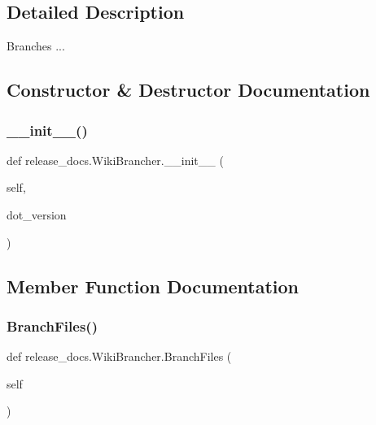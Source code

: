 \subsection{Detailed Description}
\begin{DoxyVerb}Branches ...\end{DoxyVerb}
 

\subsection{Constructor \& Destructor Documentation}
\mbox{\label{classrelease__docs_1_1WikiBrancher_a344b32e2b65f0e8bab9fbf1e670d33fd}} 
\subsubsection{\texorpdfstring{\_\_init\_\_()}{\_\_init\_\_()}}
{\footnotesize\ttfamily def release\+\_\+docs.\+Wiki\+Brancher.\+\_\+\+\_\+init\+\_\+\+\_\+ (\begin{DoxyParamCaption}\item[{}]{self,  }\item[{}]{dot\+\_\+version }\end{DoxyParamCaption})}



\subsection{Member Function Documentation}
\mbox{\label{classrelease__docs_1_1WikiBrancher_a5ef284f7e1742f465ecd0c14d2667327}} 
\subsubsection{\texorpdfstring{BranchFiles()}{BranchFiles()}}
{\footnotesize\ttfamily def release\+\_\+docs.\+Wiki\+Brancher.\+Branch\+Files (\begin{DoxyParamCaption}\item[{}]{self }\end{DoxyParamCaption})}

